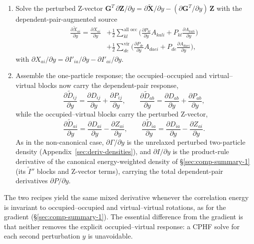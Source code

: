 \documentclass[12pt]{article}
\newcommand{\vir}{\text{vir}}
\newcommand{\alloc}{\text{all occ}}   %
\begin{document}
\begin{enumerate}
\begin{align*}
\frac{\partial P_{ab}}{\partial y}&=\frac{1}{\varepsilon_a-\varepsilon_b}\Big[
\frac{\partial I'_{ab}}{\partial y}-\frac{\partial I'_{ba}}{\partial y}
- P_{ab}\Big(\frac{\partial\varepsilon_a}{\partial y}-\frac{\partial\varepsilon_b}{\partial y}\Big)\Big].
\end{align*}
\item Solve the perturbed Z-vector
$\mathbf{G}^{T}\,\partial\mathbf{Z}/\partial y
=\partial\tilde{\mathbf{X}}/\partial y-(\partial\mathbf{G}^{T}/\partial y)\,\mathbf{Z}$
with the dependent-pair-augmented source
\begin{align*}
\frac{\partial\tilde X_{ai}}{\partial y}=\frac{\partial X_{ai}}{\partial y}
&+ \tfrac12\sum_{kl}^{\alloc}\Big(\frac{\partial P_{kl}}{\partial y}A_{kali}
   + P_{kl}\frac{\partial A_{kali}}{\partial y}\Big)\\
&+ \tfrac12\sum_{de}^{\vir}\Big(\frac{\partial P_{de}}{\partial y}A_{daei}
   + P_{de}\frac{\partial A_{daei}}{\partial y}\Big),
\end{align*}
with $\partial X_{ai}/\partial y=\partial I'_{ia}/\partial y-\partial I'_{ai}/\partial y$.
\item Assemble the one-particle response; the occupied--occupied and
virtual--virtual blocks now carry the dependent-pair response,
\begin{equation*}
\frac{\partial\tilde D_{ij}}{\partial y}=\frac{\partial D_{ij}}{\partial y}+\frac{\partial P_{ij}}{\partial y},\qquad
\frac{\partial\tilde D_{ab}}{\partial y}=\frac{\partial D_{ab}}{\partial y}+\frac{\partial P_{ab}}{\partial y},
\end{equation*}
while the occupied--virtual blocks carry the perturbed Z-vector,
\begin{equation*}
\frac{\partial\tilde D_{ai}}{\partial y}=\frac{\partial D_{ai}}{\partial y}-\frac{\partial Z_{ai}}{\partial y},\qquad
\frac{\partial\tilde D_{ia}}{\partial y}=\frac{\partial D_{ia}}{\partial y}-\frac{\partial Z_{ai}}{\partial y}.
\end{equation*}
As in the non-canonical case, $\partial\Gamma/\partial y$ is the unrelaxed
perturbed two-particle density (Appendix~\ref{sec:deriv-densities}), and $\partial
I/\partial y$ is the product-rule derivative of the canonical energy-weighted
density of \S\ref{sec:comp-summary-1} (its $\tilde I''$ blocks and Z-vector terms),
carrying the total dependent-pair derivatives $\partial P/\partial y$.
\end{enumerate}

The two recipes yield the same mixed derivative whenever the correlation energy
is invariant to occupied--occupied and virtual--virtual rotations, as for the
gradient (\S\ref{sec:comp-summary-1}).  The essential difference from the gradient is that neither
removes the explicit occupied--virtual response: a CPHF solve for each second
perturbation $y$ is unavoidable.
\end{document}
